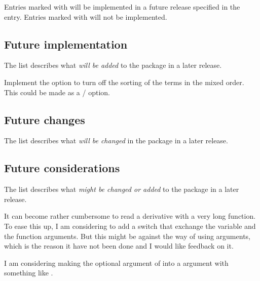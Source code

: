 	Entries marked with \cmark{} will be implemented in a future release specified in the entry. Entries marked with \xmark{} will not be implemented.
	
	\subsection{Future implementation}
	The list describes what \emph{will be added} to the package in a later release.
	\begin{todo}
		\item Implement the option to turn off the sorting of the terms in the mixed order. This could be made as a  /  option. \\
	\end{todo}
	
	\subsection{Future changes}
	The list describes what \emph{will be changed} in the package in a later release.
	\begin{changes}
		\item
	\end{changes}
	
	\subsection{Future considerations}
	The list describes what \emph{might be changed or added} to the package in a later release.
	\begin{consideration}
		\item It can become rather cumbersome to read a derivative with a very long function. To ease this up, I am considering to add a switch that exchange the variable and the function arguments. But this might be against the \latex{} way of using arguments, which is the reason it have not been done and I would like feedback on it. \label{consid:Fun_Var_switch}
		\item I am considering making the optional argument of \macro[index=false]{\slashfrac} into a  argument with something like . \label{consid:slashfrac_opt} \\
	\end{consideration}
	
